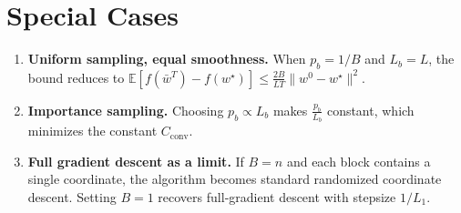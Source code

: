 \documentclass[11pt]{article}
\newcommand{\E}{\mathbb{E}}
\begin{document}
\section*{Special Cases}
\begin{enumerate}[label=\arabic*.]
\item \textbf{Uniform sampling, equal smoothness.}
When $p_{b}=1/B$ and $L_{b}=L$, the bound reduces to
$\E[f(\bar w^{T})-f(w^{\star})]\le
\frac{2B}{L T}\|w^{0}-w^{\star}\|^{2}$.
\item \textbf{Importance sampling.}
Choosing $p_{b}\propto L_{b}$ makes $\frac{p_{b}}{L_{b}}$ constant,
which minimizes the constant $C_{\text{conv}}$.
\item \textbf{Full gradient descent as a limit.}
If $B=n$ and each block contains a single coordinate, the algorithm
becomes standard randomized coordinate descent.  Setting $B=1$ recovers
full‑gradient descent with stepsize $1/L_{1}$.
\end{enumerate}
\end{document}
